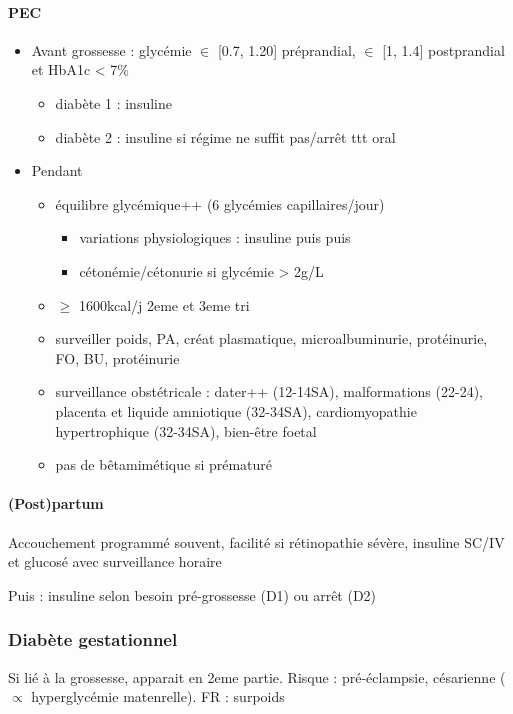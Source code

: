\documentclass[11pt]{article}
\begin{document}
\paragraph{PEC}
\label{sec:org04be396}
\begin{itemize}
\item Avant grossesse : glycémie \(\in\) [0.7, 1.20] préprandial, \(\in\) [1, 1.4]
postprandial et HbA1c < 7\%
\begin{itemize}
\item diabète 1 : \inc insuline
\item diabète 2 : insuline si régime ne suffit pas/arrêt ttt oral
\end{itemize}
\item Pendant    
\begin{itemize}
\item équilibre glycémique++ (6 glycémies capillaires/jour)
\begin{itemize}
\item \danger variations physiologiques : insuline \dec puis \inc puis \dec\dec
\item cétonémie/cétonurie si glycémie > 2g/L
\end{itemize}
\item \(\ge\) 1600kcal/j 2eme et 3eme tri
\item surveiller poids, PA, créat plasmatique, microalbuminurie, protéinurie, FO,
BU, protéinurie
\item surveillance obstétricale : dater++ (12-14SA), malformations (22-24), placenta et liquide
amniotique (32-34SA), cardiomyopathie hypertrophique (32-34SA), bien-être
foetal
\item pas de bêtamimétique si prématuré
\end{itemize}
\end{itemize}
\paragraph{(Post)partum}
\label{sec:org290e001}
Accouchement programmé souvent, facilité si rétinopathie sévère, insuline
  SC/IV et glucosé avec surveillance horaire

Puis : insuline selon besoin pré-grossesse (D1) ou arrêt (D2)

\subsubsection{Diabète gestationnel}
\label{sec:org1d85f3f}
Si lié à la grossesse, apparait en 2eme partie. Risque : pré-éclampsie,
césarienne (\(\propto\) hyperglycémie matenrelle). FR : surpoids 
\end{document}
